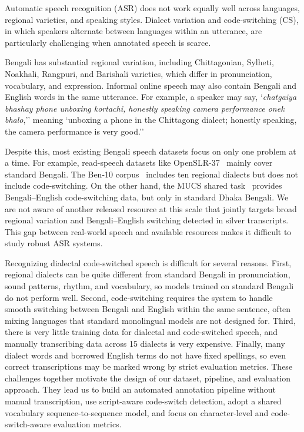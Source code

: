 \documentclass[journal]{IEEEtran}
\begin{document}
Automatic speech recognition (ASR) does not work equally well across languages,
regional varieties, and speaking styles. Dialect variation and code-switching
(CS), in which speakers alternate between languages within an utterance, are
particularly challenging when annotated speech is scarce.

Bengali has substantial regional variation, including Chittagonian, Sylheti,
Noakhali, Rangpuri, and Barishali varieties, which differ in pronunciation,
vocabulary, and expression. Informal online speech may also contain Bengali and
English words in the same utterance. For example, a speaker may say,
`\textit{chatgaiya bhashay phone unboxing kortachi, honestly speaking camera
performance onek bhalo},'' meaning `unboxing a phone in the Chittagong dialect;
honestly speaking, the camera performance is very good.''

Despite this, most existing Bengali speech datasets focus on only one problem at a time. For example, read-speech datasets like OpenSLR-37~\cite{kjartansson2018bengali} mainly cover standard Bengali. The Ben-10 corpus~\cite{ben10_2025} includes ten regional dialects but does not include code-switching. On the other hand, the MUCS shared task~\cite{mucs2021} provides Bengali--English code-switching data, but only in standard Dhaka Bengali. We are not aware of another released resource at this scale that jointly targets broad regional variation and Bengali--English switching detected in silver transcripts. This gap between real-world speech and available resources makes it difficult to study robust ASR systems.


Recognizing dialectal code-switched speech is difficult for several reasons. First, regional dialects can be quite different from standard Bengali in pronunciation, sound patterns, rhythm, and vocabulary, so models trained on standard Bengali do not perform well. Second, code-switching requires the system to handle smooth switching between Bengali and English within the same sentence, often mixing languages that standard monolingual models are not designed for. Third, there is very little training data for dialectal and code-switched speech, and manually transcribing data across 15 dialects is very expensive. Finally, many dialect words and borrowed English terms do not have fixed spellings, so even correct transcriptions may be marked wrong by strict evaluation metrics. These challenges together motivate the design of our dataset, pipeline, and evaluation approach. They lead us to build an automated annotation pipeline without manual transcription, use script-aware code-switch detection, adopt a shared vocabulary sequence-to-sequence model, and focus on character-level and code-switch-aware evaluation metrics.
\end{document}

